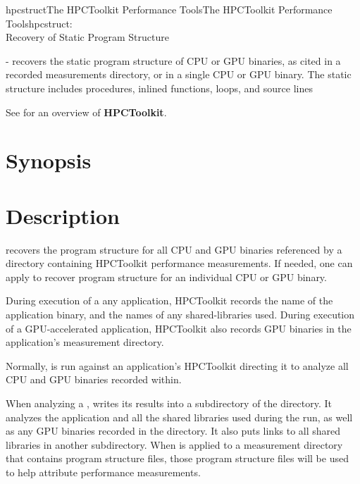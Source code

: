\documentclass[english]{article}
\begin{document}
\begin{Name}{1}{hpcstruct}{The HPCToolkit Performance Tools}{The HPCToolkit Performance Tools}{hpcstruct:\\ Recovery of Static Program Structure}

 - recovers the static program structure of CPU or GPU binaries, as cited in a recorded measurements directory, or
in a single CPU or GPU binary.
The static structure includes procedures, inlined functions, loops, and source lines

See  for an overview of \textbf{HPCToolkit}.

\end{Name}

\section{Synopsis}

  

  

\section{Description}

 recovers the program structure for all CPU and GPU
binaries referenced by a directory containing HPCToolkit performance
measurements. If needed, one can apply  to recover program
structure for an individual CPU or GPU binary.

During execution of a any application, HPCToolkit records the name of the application binary,
and the names of any shared-libraries used. During execution of a GPU-accelerated application,
HPCToolkit also records GPU binaries in the application's measurement directory.

Normally,  is run against an application's HPCToolkit  directing
it to analyze all CPU and GPU binaries recorded within.

When analyzing a ,   writes its results into a subdirectory of the directory.
It analyzes the application and all the shared libraries used during the run, as well as any
GPU binaries recorded in the directory.  It also puts links to all shared libraries in another subdirectory.
When  is applied to a measurement directory that contains program structure files,
those program structure files will be used to help attribute performance measurements.
\end{document}
